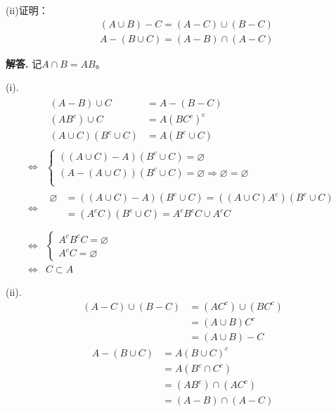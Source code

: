 \documentclass[12pt, a4paper, oneside]{ctexart}
\newenvironment{solution}{\par\noindent\textbf{解答. }}{\bigskip\par}
\begin{document}
(ii)证明：\begin{equation*}
    \begin{aligned}
        &(A\cup B)-C=(A-C)\cup(B-C)\\
        &A-(B\cup C)=(A-B)\cap(A-C)
    \end{aligned}
\end{equation*}
\begin{solution}
    记$A\cap B = AB$。

    (i). \begin{equation*}
        \begin{aligned}
            &\begin{aligned}
                (A-B)\cup C &= A-(B-C)\\
                (AB^c)\cup C &= A(BC^c)^c\\
                (A\cup C)(B^c\cup C) &= A(B^c\cup C)
            \end{aligned}\\
            \iff& \begin{cases}
                ((A\cup C)-A)(B^c\cup C) = \varnothing\\
                (A-(A\cup C))(B^c\cup C) = \varnothing\Rightarrow \varnothing = \varnothing\\
            \end{cases}\\
            \iff&\begin{aligned}
                \varnothing &= ((A\cup C)-A)(B^c\cup C)= ((A\cup C)A^c)(B^c\cup C)\\
                &= (A^cC)(B^c\cup C)= A^cB^cC\cup A^cC \\
            \end{aligned}\\
            \iff&\begin{cases}
                A^cB^cC = \varnothing\\
                A^cC = \varnothing
            \end{cases}\\
            \iff& C\subset A
        \end{aligned}
    \end{equation*}

    (ii). \begin{equation*}
        \begin{aligned}
            (A-C)\cup(B-C)&=(AC^c)\cup(BC^c)\\
            &= (A\cup B)C^c\\
            &= (A\cup B)-C
        \end{aligned}
    \end{equation*}
    \begin{equation*}
        \begin{aligned}
            A-(B\cup C) &= A(B\cup C)^c\\
            &= A(B^c\cap C^c)\\
            &= (AB^c)\cap(AC^c)\\
            &= (A-B)\cap(A-C)
        \end{aligned}
    \end{equation*}
\end{solution}
\end{document}
